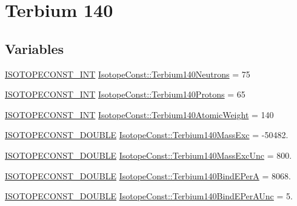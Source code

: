\hypertarget{group___isotope_const-_terbium-_tb140}{}\section{Terbium 140}
\label{group___isotope_const-_terbium-_tb140}
\subsection*{Variables}
\begin{DoxyCompactItemize}
\item 
\mbox{\hyperlink{group___isotope_const-_macros_ga5f18360b3e99483a35c32d789e62621c}{I\+S\+O\+T\+O\+P\+E\+C\+O\+N\+S\+T\+\_\+\+I\+NT}} \mbox{\hyperlink{group___isotope_const-_terbium-_tb140_ga2e2a0bf1b7802a56d9a545f94b380e60}{Isotope\+Const\+::\+Terbium140\+Neutrons}} = 75
\item 
\mbox{\hyperlink{group___isotope_const-_macros_ga5f18360b3e99483a35c32d789e62621c}{I\+S\+O\+T\+O\+P\+E\+C\+O\+N\+S\+T\+\_\+\+I\+NT}} \mbox{\hyperlink{group___isotope_const-_terbium-_tb140_gae20ccccccc392ab9d4d0efbca1ad7dfa}{Isotope\+Const\+::\+Terbium140\+Protons}} = 65
\item 
\mbox{\hyperlink{group___isotope_const-_macros_ga5f18360b3e99483a35c32d789e62621c}{I\+S\+O\+T\+O\+P\+E\+C\+O\+N\+S\+T\+\_\+\+I\+NT}} \mbox{\hyperlink{group___isotope_const-_terbium-_tb140_gac3b310ffa2ebbb7609a6ab63e2a7478f}{Isotope\+Const\+::\+Terbium140\+Atomic\+Weight}} = 140
\item 
\mbox{\hyperlink{group___isotope_const-_macros_ga8f45a7272ce02c0b4c65c44636ed719a}{I\+S\+O\+T\+O\+P\+E\+C\+O\+N\+S\+T\+\_\+\+D\+O\+U\+B\+LE}} \mbox{\hyperlink{group___isotope_const-_terbium-_tb140_gaea66b36cd134805b76803815e67db5ce}{Isotope\+Const\+::\+Terbium140\+Mass\+Exc}} = -\/50482.
\item 
\mbox{\hyperlink{group___isotope_const-_macros_ga8f45a7272ce02c0b4c65c44636ed719a}{I\+S\+O\+T\+O\+P\+E\+C\+O\+N\+S\+T\+\_\+\+D\+O\+U\+B\+LE}} \mbox{\hyperlink{group___isotope_const-_terbium-_tb140_gaf319b720fe681cdd552b9f57c701de2e}{Isotope\+Const\+::\+Terbium140\+Mass\+Exc\+Unc}} = 800.
\item 
\mbox{\hyperlink{group___isotope_const-_macros_ga8f45a7272ce02c0b4c65c44636ed719a}{I\+S\+O\+T\+O\+P\+E\+C\+O\+N\+S\+T\+\_\+\+D\+O\+U\+B\+LE}} \mbox{\hyperlink{group___isotope_const-_terbium-_tb140_ga7da150e6aae3230c958360f226b26b5b}{Isotope\+Const\+::\+Terbium140\+Bind\+E\+PerA}} = 8068.
\item 
\mbox{\hyperlink{group___isotope_const-_macros_ga8f45a7272ce02c0b4c65c44636ed719a}{I\+S\+O\+T\+O\+P\+E\+C\+O\+N\+S\+T\+\_\+\+D\+O\+U\+B\+LE}} \mbox{\hyperlink{group___isotope_const-_terbium-_tb140_gaa076150bcac984780f8074cc2b26eb50}{Isotope\+Const\+::\+Terbium140\+Bind\+E\+Per\+A\+Unc}} = 5.

\end{DoxyCompactItemize}
